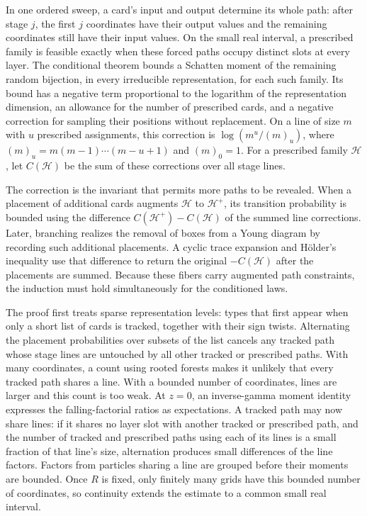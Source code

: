 In one ordered sweep, a card's input and output determine its whole path:
after stage \(j\), the first \(j\) coordinates have their output values
and the remaining coordinates still have their input values. On the small
real interval, a prescribed family is feasible exactly when these forced paths occupy distinct slots
at every layer. The conditional theorem bounds a Schatten moment of the
remaining random bijection, in every irreducible representation, for
each such family. Its bound has a negative term proportional to the
logarithm of the representation dimension, an allowance for the number
of prescribed cards, and a negative
correction for sampling their positions without replacement. On a line
of size \(m\) with \(u\) prescribed assignments, this correction is
\(\log(m^u/(m)_u)\), where \((m)_u=m(m-1)\cdots(m-u+1)\) and \((m)_0=1\).
For a prescribed family \(\mathcal H\), let \(C(\mathcal H)\) be the sum
of these corrections over all stage lines.

The correction is the invariant that permits more paths to be revealed.
When a placement of additional cards augments \(\mathcal H\) to
\(\mathcal H^+\), its transition probability is bounded using the difference
\(C(\mathcal H^+)-C(\mathcal H)\) of the summed line corrections.
Later, branching realizes the removal of boxes from a Young diagram by
recording such additional placements. A cyclic trace expansion and
H\"older's inequality use that difference to return the original
\(-C(\mathcal H)\) after the placements are summed. Because these fibers
carry augmented path constraints, the induction must hold simultaneously
for the conditioned laws.

The proof first treats sparse representation levels: types that first appear
when only a short list of cards is tracked, together with their sign
twists. Alternating the placement probabilities over subsets of the list
cancels any tracked path whose stage lines are untouched by all other
tracked or prescribed paths. With many coordinates, a count using rooted
forests makes it unlikely that every tracked path shares a line. With a
bounded number of coordinates, lines are larger and this count is too
weak. At \(z=0\), an inverse-gamma moment identity expresses the
falling-factorial ratios as expectations. A tracked path may now share
lines: if it shares no layer slot with another tracked or prescribed
path, and the number of tracked and prescribed paths using each of its
lines is a small fraction of that line's size, alternation produces small
differences of the line factors.
Factors from particles sharing a line are grouped before their moments
are bounded. Once \(R\) is fixed, only finitely many grids have this
bounded number of coordinates, so continuity extends the estimate to a
common small real interval.

